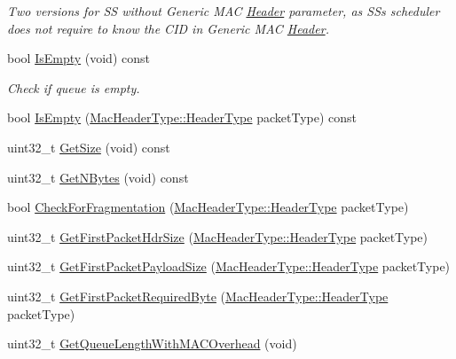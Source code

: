 \begin{DoxyCompactItemize}
\begin{DoxyCompactList}\small\item\em Two versions for SS without Generic M\+AC \hyperlink{classns3_1_1Header}{Header} parameter, as SS\textquotesingle{}s scheduler does not require to know the C\+ID in Generic M\+AC \hyperlink{classns3_1_1Header}{Header}. \end{DoxyCompactList}\item 
bool \hyperlink{classns3_1_1WimaxMacQueue_a45fc4e6c31ac1789b8fdedf4a8714e12}{Is\+Empty} (void) const 
\begin{DoxyCompactList}\small\item\em Check if queue is empty. \end{DoxyCompactList}\item 
bool \hyperlink{classns3_1_1WimaxMacQueue_ac5441bd719302dd5e546601c19b0b23c}{Is\+Empty} (\hyperlink{classns3_1_1MacHeaderType_a54d8fc8bc93a2b7865627965cdd31c20}{Mac\+Header\+Type\+::\+Header\+Type} packet\+Type) const 
\item 
uint32\+\_\+t \hyperlink{classns3_1_1WimaxMacQueue_ac12bb7a7176fec0c2a275b181b4b5fa4}{Get\+Size} (void) const 
\item 
uint32\+\_\+t \hyperlink{classns3_1_1WimaxMacQueue_a844cc908debd8c4a4038c0c2627cfec4}{Get\+N\+Bytes} (void) const 
\item 
bool \hyperlink{classns3_1_1WimaxMacQueue_aba14f6efd4ebb33ac03afd4bbc1461b6}{Check\+For\+Fragmentation} (\hyperlink{classns3_1_1MacHeaderType_a54d8fc8bc93a2b7865627965cdd31c20}{Mac\+Header\+Type\+::\+Header\+Type} packet\+Type)
\item 
uint32\+\_\+t \hyperlink{classns3_1_1WimaxMacQueue_a768ad0214a2ed77aea0603533a45d5c6}{Get\+First\+Packet\+Hdr\+Size} (\hyperlink{classns3_1_1MacHeaderType_a54d8fc8bc93a2b7865627965cdd31c20}{Mac\+Header\+Type\+::\+Header\+Type} packet\+Type)
\item 
uint32\+\_\+t \hyperlink{classns3_1_1WimaxMacQueue_a149ce1f253758a203f0b4539ef2c1270}{Get\+First\+Packet\+Payload\+Size} (\hyperlink{classns3_1_1MacHeaderType_a54d8fc8bc93a2b7865627965cdd31c20}{Mac\+Header\+Type\+::\+Header\+Type} packet\+Type)
\item 
uint32\+\_\+t \hyperlink{classns3_1_1WimaxMacQueue_a3e407a26428eca8d2486bb60b29a612b}{Get\+First\+Packet\+Required\+Byte} (\hyperlink{classns3_1_1MacHeaderType_a54d8fc8bc93a2b7865627965cdd31c20}{Mac\+Header\+Type\+::\+Header\+Type} packet\+Type)
\item 
uint32\+\_\+t \hyperlink{classns3_1_1WimaxMacQueue_a5e0c4f03f3bf8f8c3dd6eb06cdea1c6a}{Get\+Queue\+Length\+With\+M\+A\+C\+Overhead} (void)

\end{DoxyCompactItemize}
